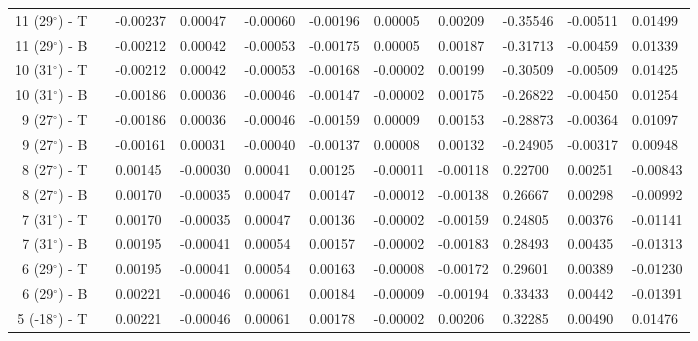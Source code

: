 \begin{table}[H]
\begin{longtable}{@{}rllllllllll@{}}
  11 (29$^\circ$) - T &&      -0.00237 &       0.00047 &      -0.00060 &      -0.00196 &       0.00005 &       0.00209 &    -0.35546 &    -0.00511 &     0.01499 \\
  11 (29$^\circ$) - B &&      -0.00212 &       0.00042 &      -0.00053 &      -0.00175 &       0.00005 &       0.00187 &    -0.31713 &    -0.00459 &     0.01339 \\\midrule
  10 (31$^\circ$) - T &&      -0.00212 &       0.00042 &      -0.00053 &      -0.00168 &      -0.00002 &       0.00199 &    -0.30509 &    -0.00509 &     0.01425 \\
  10 (31$^\circ$) - B &&      -0.00186 &       0.00036 &      -0.00046 &      -0.00147 &      -0.00002 &       0.00175 &    -0.26822 &    -0.00450 &     0.01254 \\\midrule
   9 (27$^\circ$) - T &&      -0.00186 &       0.00036 &      -0.00046 &      -0.00159 &       0.00009 &       0.00153 &    -0.28873 &    -0.00364 &     0.01097 \\
   9 (27$^\circ$) - B &&      -0.00161 &       0.00031 &      -0.00040 &      -0.00137 &       0.00008 &       0.00132 &    -0.24905 &    -0.00317 &     0.00948 \\\midrule
   8 (27$^\circ$) - T &&       0.00145 &      -0.00030 &       0.00041 &       0.00125 &      -0.00011 &      -0.00118 &     0.22700 &     0.00251 &    -0.00843 \\
   8 (27$^\circ$) - B &&       0.00170 &      -0.00035 &       0.00047 &       0.00147 &      -0.00012 &      -0.00138 &     0.26667 &     0.00298 &    -0.00992 \\\midrule
   7 (31$^\circ$) - T &&       0.00170 &      -0.00035 &       0.00047 &       0.00136 &      -0.00002 &      -0.00159 &     0.24805 &     0.00376 &    -0.01141 \\
   7 (31$^\circ$) - B &&       0.00195 &      -0.00041 &       0.00054 &       0.00157 &      -0.00002 &      -0.00183 &     0.28493 &     0.00435 &    -0.01313 \\\midrule
   6 (29$^\circ$) - T &&       0.00195 &      -0.00041 &       0.00054 &       0.00163 &      -0.00008 &      -0.00172 &     0.29601 &     0.00389 &    -0.01230 \\
   6 (29$^\circ$) - B &&       0.00221 &      -0.00046 &       0.00061 &       0.00184 &      -0.00009 &      -0.00194 &     0.33433 &     0.00442 &    -0.01391 \\\midrule
  5 (-18$^\circ$) - T &&       0.00221 &      -0.00046 &       0.00061 &       0.00178 &      -0.00002 &       0.00206 &     0.32285 &     0.00490 &     0.01476 \\

\end{longtable}
\end{table}
